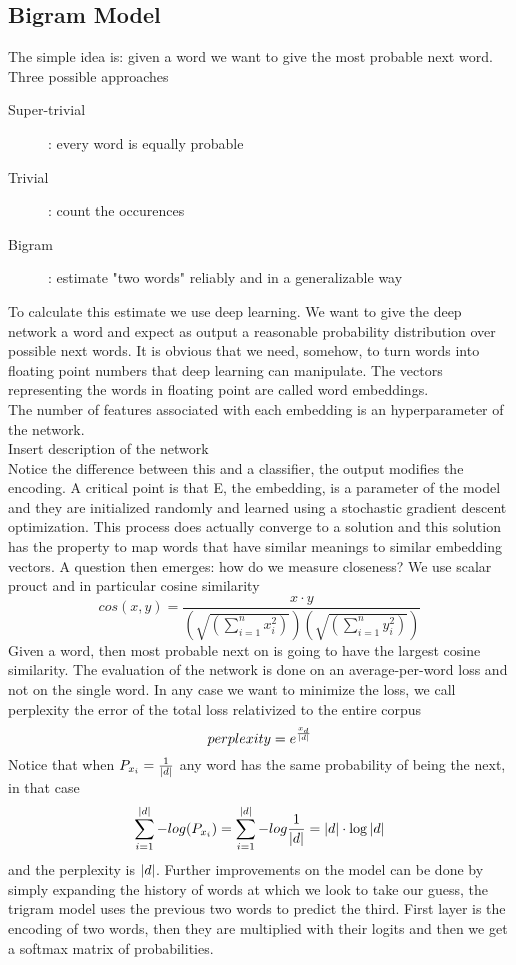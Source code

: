  \subsection{Bigram Model}
 The simple idea is: given a word we want to give the most probable next word. Three possible approaches
 \begin{description}
    \item[Super-trivial]: every word is equally probable
    \item[Trivial]: count the occurences
    \item[Bigram]: estimate "two words" reliably and in a generalizable way   
 \end{description}
 To calculate this estimate we use deep learning. We want to give the deep network a word and expect as output a reasonable probability distribution over possible next words. It is obvious that we need, somehow, to turn words into floating point numbers that deep learning can manipulate. The vectors representing the words in floating point are called word embeddings.\\
 The number of features associated with each embedding is an hyperparameter of the network.\\
 Insert description of the network\\
 Notice the difference between this and a classifier, the output modifies the encoding. A critical point is that E, the embedding, is a parameter of the model and they are initialized randomly and learned using a stochastic gradient descent optimization. This process does actually converge to a solution and this solution has the property to map words that have similar meanings to similar embedding vectors. A question then emerges: how do we measure closeness? We use scalar prouct and in particular cosine similarity 
 \[ 
    cos(x,y) = \frac{x\cdot y}{(\sqrt{(\sum_{i=1}^{n}{x_i^2})})(\sqrt{(\sum_{i=1}^{n}{y_i^2})})} 
 \]
 Given a word, then most probable next on is going to have the largest cosine similarity. The evaluation of the network is done on an average-per-word loss and not on the single word. In any case we want to minimize the loss, we call perplexity the error of the total loss relativized to the entire corpus
 \[ 
   perplexity = e^{\frac{x_d}{\left\lvert d\right\rvert}} 
 \]
 Notice that when $P_{x_i} = \frac{1}{\left\lvert d\right\rvert}$ any word has the same probability of being the next, in that case
 \[ 
   \sum_{i=1}^{\left\lvert d\right\rvert}{-log(P_{x_i})} = \sum_{i=1}^{\left\lvert d\right\rvert}{-log{\frac{1}{\left\lvert d\right\rvert}}} = \left\lvert d\right\rvert \cdot \log{\left\lvert d\right\rvert}
 \]
 and the perplexity is $\left\lvert d\right\rvert$.
Further improvements on the model can be done by simply expanding the history of words at which we look to take our guess, the trigram model uses the previous two words to predict the third. First layer is the encoding of two words, then they are multiplied with their logits and then we get a softmax matrix of probabilities.
